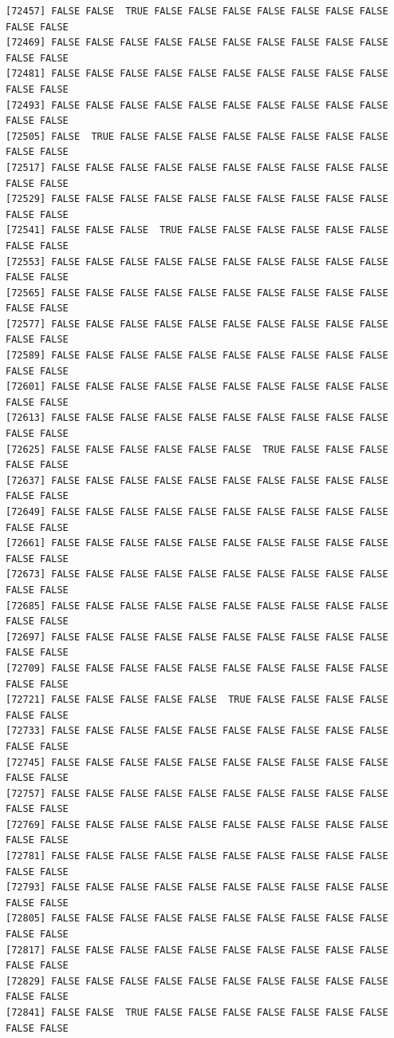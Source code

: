 \documentclass[
  a4paper,
  DIV=11,
  numbers=noendperiod]{scrartcl}
\begin{document}
\begin{verbatim}
[72457] FALSE FALSE  TRUE FALSE FALSE FALSE FALSE FALSE FALSE FALSE FALSE FALSE
[72469] FALSE FALSE FALSE FALSE FALSE FALSE FALSE FALSE FALSE FALSE FALSE FALSE
[72481] FALSE FALSE FALSE FALSE FALSE FALSE FALSE FALSE FALSE FALSE FALSE FALSE
[72493] FALSE FALSE FALSE FALSE FALSE FALSE FALSE FALSE FALSE FALSE FALSE FALSE
[72505] FALSE  TRUE FALSE FALSE FALSE FALSE FALSE FALSE FALSE FALSE FALSE FALSE
[72517] FALSE FALSE FALSE FALSE FALSE FALSE FALSE FALSE FALSE FALSE FALSE FALSE
[72529] FALSE FALSE FALSE FALSE FALSE FALSE FALSE FALSE FALSE FALSE FALSE FALSE
[72541] FALSE FALSE FALSE  TRUE FALSE FALSE FALSE FALSE FALSE FALSE FALSE FALSE
[72553] FALSE FALSE FALSE FALSE FALSE FALSE FALSE FALSE FALSE FALSE FALSE FALSE
[72565] FALSE FALSE FALSE FALSE FALSE FALSE FALSE FALSE FALSE FALSE FALSE FALSE
[72577] FALSE FALSE FALSE FALSE FALSE FALSE FALSE FALSE FALSE FALSE FALSE FALSE
[72589] FALSE FALSE FALSE FALSE FALSE FALSE FALSE FALSE FALSE FALSE FALSE FALSE
[72601] FALSE FALSE FALSE FALSE FALSE FALSE FALSE FALSE FALSE FALSE FALSE FALSE
[72613] FALSE FALSE FALSE FALSE FALSE FALSE FALSE FALSE FALSE FALSE FALSE FALSE
[72625] FALSE FALSE FALSE FALSE FALSE FALSE  TRUE FALSE FALSE FALSE FALSE FALSE
[72637] FALSE FALSE FALSE FALSE FALSE FALSE FALSE FALSE FALSE FALSE FALSE FALSE
[72649] FALSE FALSE FALSE FALSE FALSE FALSE FALSE FALSE FALSE FALSE FALSE FALSE
[72661] FALSE FALSE FALSE FALSE FALSE FALSE FALSE FALSE FALSE FALSE FALSE FALSE
[72673] FALSE FALSE FALSE FALSE FALSE FALSE FALSE FALSE FALSE FALSE FALSE FALSE
[72685] FALSE FALSE FALSE FALSE FALSE FALSE FALSE FALSE FALSE FALSE FALSE FALSE
[72697] FALSE FALSE FALSE FALSE FALSE FALSE FALSE FALSE FALSE FALSE FALSE FALSE
[72709] FALSE FALSE FALSE FALSE FALSE FALSE FALSE FALSE FALSE FALSE FALSE FALSE
[72721] FALSE FALSE FALSE FALSE FALSE  TRUE FALSE FALSE FALSE FALSE FALSE FALSE
[72733] FALSE FALSE FALSE FALSE FALSE FALSE FALSE FALSE FALSE FALSE FALSE FALSE
[72745] FALSE FALSE FALSE FALSE FALSE FALSE FALSE FALSE FALSE FALSE FALSE FALSE
[72757] FALSE FALSE FALSE FALSE FALSE FALSE FALSE FALSE FALSE FALSE FALSE FALSE
[72769] FALSE FALSE FALSE FALSE FALSE FALSE FALSE FALSE FALSE FALSE FALSE FALSE
[72781] FALSE FALSE FALSE FALSE FALSE FALSE FALSE FALSE FALSE FALSE FALSE FALSE
[72793] FALSE FALSE FALSE FALSE FALSE FALSE FALSE FALSE FALSE FALSE FALSE FALSE
[72805] FALSE FALSE FALSE FALSE FALSE FALSE FALSE FALSE FALSE FALSE FALSE FALSE
[72817] FALSE FALSE FALSE FALSE FALSE FALSE FALSE FALSE FALSE FALSE FALSE FALSE
[72829] FALSE FALSE FALSE FALSE FALSE FALSE FALSE FALSE FALSE FALSE FALSE FALSE
[72841] FALSE FALSE  TRUE FALSE FALSE FALSE FALSE FALSE FALSE FALSE FALSE FALSE

\end{verbatim}
\end{document}
